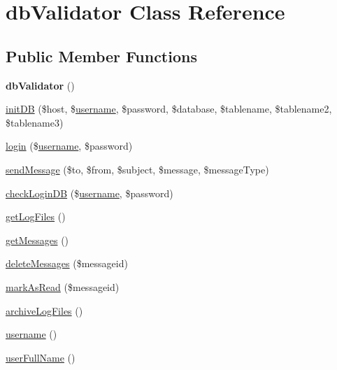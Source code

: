 \hypertarget{classdb_validator}{\section{db\-Validator Class Reference}
\label{classdb_validator}
}
\subsection*{Public Member Functions}
\begin{DoxyCompactItemize}
\item 
\hypertarget{classdb_validator_a435645149bfe52fdd81b83852122e5a1}{{\bfseries db\-Validator} ()}\label{classdb_validator_a435645149bfe52fdd81b83852122e5a1}

\item 
\hyperlink{classdb_validator_ad6a1c58aff12aedff7e0beb6f38514c4}{init\-D\-B} (\$host, \$\hyperlink{classdb_validator_a7475524fbb2e38dd6c9f7a6661b0bb81}{username}, \$password, \$database, \$tablename, \$tablename2, \$tablename3)
\item 
\hyperlink{classdb_validator_ad870c94a5775868891f6c50b9818d627}{login} (\$\hyperlink{classdb_validator_a7475524fbb2e38dd6c9f7a6661b0bb81}{username}, \$password)
\item 
\hyperlink{classdb_validator_abec8e80a38381c53efd3dc68278effbf}{send\-Message} (\$to, \$from, \$subject, \$message, \$message\-Type)
\item 
\hyperlink{classdb_validator_a10f97b8f1c865ad4df98089b55375904}{check\-Login\-D\-B} (\$\hyperlink{classdb_validator_a7475524fbb2e38dd6c9f7a6661b0bb81}{username}, \$password)
\item 
\hyperlink{classdb_validator_ac552a64e58f1622acd9ce5d8dd16a1cd}{get\-Log\-Files} ()
\item 
\hyperlink{classdb_validator_a7347b0b89cca1d7604e93f5b5e896fc4}{get\-Messages} ()
\item 
\hyperlink{classdb_validator_a53da26de78548953a6858e880f5dc816}{delete\-Messages} (\$messageid)
\item 
\hyperlink{classdb_validator_af4c269840e9d50b9dd4f0d96fa1146f4}{mark\-As\-Read} (\$messageid)
\item 
\hyperlink{classdb_validator_a224569f7d96cd6b501b4e9b6fabb6ccd}{archive\-Log\-Files} ()
\item 
\hyperlink{classdb_validator_a7475524fbb2e38dd6c9f7a6661b0bb81}{username} ()
\item 
\hyperlink{classdb_validator_a81a47eeb08046245d1cd0c80c2d70daa}{user\-Full\-Name} ()

\end{DoxyCompactItemize}

